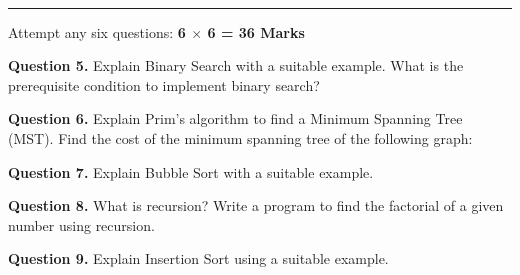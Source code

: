 \documentclass[11pt,a4paper]{article}
\begin{document}
\\[4pt]
\rule{\linewidth}{0.4pt}\smallskip

Attempt any six questions: \hfill   \textbf{6 $ \times$ 6 = 36 Marks}

\medskip



\noindent   \textbf{Question 5.} Explain Binary Search with a suitable example. What is the prerequisite condition to implement binary search?

\medskip



\noindent   \textbf{Question 6.} Explain Prim's algorithm to find a Minimum Spanning Tree (MST). Find the cost of the minimum spanning tree of the following graph:

\begin{center}

\end{center}

\medskip



\noindent   \textbf{Question 7.} Explain Bubble Sort with a suitable example.

\medskip



\noindent   \textbf{Question 8.} What is recursion? Write a program to find the factorial of a given number using recursion.

\medskip



\noindent   \textbf{Question 9.} Explain Insertion Sort using a suitable example.

\medskip
\end{document}
